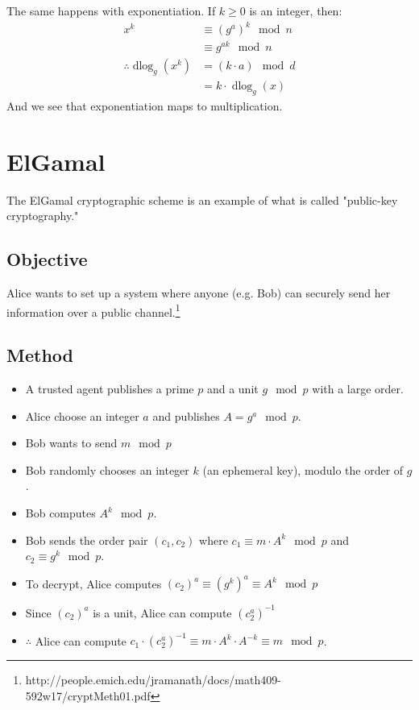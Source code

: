 \documentclass[10pt]{article}
\theoremstyle{definition}
\theoremstyle{remark}
\DeclareMathOperator{\dlog}{dlog}
\begin{document}
The same happens with exponentiation.  If $k \geq 0$ is an integer, then:
\begin{align*}
x^k &\equiv (g^a)^k \mod n \\
	&\equiv g^{ak} \mod n \\
\therefore \dlog_g(x^k) &= (k \cdot a) \mod d \\
&= k \cdot \dlog_g(x)
\end{align*}
And we see that exponentiation maps to multiplication.
\section{ElGamal}
The ElGamal cryptographic scheme is an example of what is called "public-key cryptography."
\subsection{Objective}
Alice wants to set up a system where anyone (e.g. Bob) can securely send her information over a public channel.\footnote{http://people.emich.edu/jramanath/docs/math409-592w17/cryptMeth01.pdf}
\subsection{Method}
\begin{itemize}
\item A trusted agent publishes a prime $p$ and a unit $g \mod p$ with a large order.
\item Alice choose an integer $a$ and publishes $A=g^a\mod p$.
\item Bob wants to send $m \mod p$
\item Bob randomly chooses an integer $k$ (an ephemeral key), modulo the order of $g$.
\item Bob computes $A^k \mod p$.
\item Bob sends the order pair $(c_1,c_2)$ where $c_1 \equiv m \cdot A^k \mod p$ and $c_2 \equiv g^k \mod p$.
\item To decrypt, Alice computes $(c_2)^a \equiv (g^k)^a \equiv A^k \mod p$
\item Since $(c_2)^a$ is a unit, Alice can compute $(c_{2}^a)^{-1}$
\item $\therefore$ Alice can compute $c_1 \cdot (c_{2}^a)^{-1} \equiv m \cdot A^k \cdot A^{-k} \equiv m \mod p$.
\end{itemize}
\end{document}
